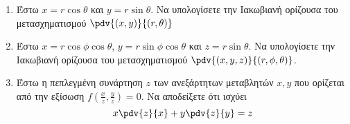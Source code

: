 \begin{enumerate}
	\item Έστω $ x = r \cos{\theta} $ και $ y = r \sin{\theta} $. Να υπολογίσετε την Ιακωβιανή
	ορίζουσα του μετασχηματισμού $ \pdv{(x,y)}{(r,\theta)} $

	\item Έστω $ x = r \cos{\phi} \cos{\theta} $, $ y = r \sin{\phi} \cos{\theta} $ και $ z = r
	\sin{\theta} $. Να υπολογίσετε την Ιακωβιανή ορίζουσα του μετασχηματισμού $
	\pdv{(x,y,z)}{(r,\phi, \theta)} $.

 \item Έστω η πεπλεγμένη συνάρτηση $ z $ των ανεξάρτητων μεταβλητών $ x,y $ που ορίζεται από την
	 εξίσωση $ f\left(\frac{ x }{ z }, \frac{ y }{ z }\right) = 0 $. Να αποδείξετε ότι ισχύει 
	 \[
		 x\pdv{z}{x} + y\pdv{z}{y} = z
	 \] 
\end{enumerate}



